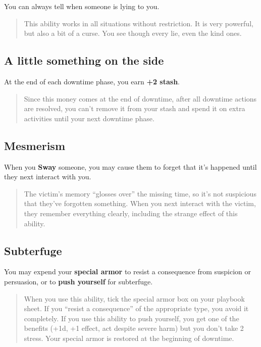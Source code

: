 \documentclass[11pt,fleqn,a5paper]{book}
\newcommand{\gameterm}[1]{\textbf{#1}}
\begin{document}
You can always tell when someone is lying to you.

\begin{quote}
	This ability works in all situations without restriction. It is very powerful, but also a bit of a curse. You see though every lie, even the kind ones.
\end{quote} 

\subsection{A little something on the side}

At the end of each downtime phase, you earn \textbf{+2 stash}.

\begin{quote}
	Since this money comes at the end of downtime, after all downtime actions are resolved, you can’t remove it from your stash and spend it on extra activities until your next downtime phase.
\end{quote} 

\subsection{Mesmerism}

When you \gameterm{Sway}  someone, you may cause them to forget that it’s happened until they next interact with you.

\begin{quote}
	The victim’s memory “glosses over” the missing time, so it’s not suspicious that they’ve forgotten something. When you next interact with the victim, they remember everything clearly, including the strange effect of this ability.
\end{quote} 

\subsection{Subterfuge}

You may expend your \textbf{special armor} to resist a consequence from suspicion or persuasion, or to \textbf{push yourself} for subterfuge.

\begin{quote}
	When you use this ability, tick the special armor box on your playbook sheet. If you “resist a consequence” of the appropriate type, you avoid it completely. If you use this ability to push yourself, you get one of the benefits (+1d, +1 effect, act despite severe harm) but you don’t take 2 stress. Your special armor is restored at the beginning of downtime.
\end{quote} 
\end{document}
